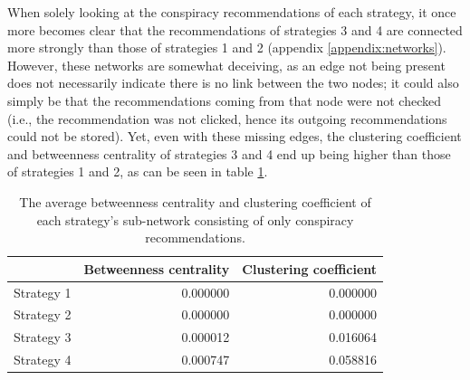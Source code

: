 \documentclass[../main.tex]{subfiles}
\begin{document}
When solely looking at the conspiracy recommendations of each strategy, it once more becomes clear that the 
recommendations of strategies 3 and 4 are connected more strongly than those of strategies 1 and 2 (appendix 
\ref{appendix:networks}). However, these networks are somewhat deceiving, as an edge not being present does not 
necessarily indicate there is no link between the two nodes; it could also simply be that the recommendations 
coming from that node were not checked (i.e., the recommendation was not clicked, hence its outgoing 
recommendations could not be stored). Yet, even with these missing edges, the clustering coefficient and 
betweenness centrality of strategies 3 and 4 end up being higher than those of strategies 1 and 2, as can be 
seen in table \ref{tab:sub-net_metrics}. 

\begin{table}[h]
\centering
\begin{tabular}{lrr}
\toprule
{} &  Betweenness centrality &  Clustering coefficient \\
\midrule
Strategy 1 &                0.000000 &                0.000000 \\
Strategy 2 &                0.000000 &                0.000000 \\
Strategy 3 &                0.000012 &                0.016064 \\
Strategy 4 &                0.000747 &                0.058816 \\
\bottomrule
\end{tabular}
\caption{\label{tab:sub-net_metrics} The average betweenness centrality and clustering coefficient of each strategy's sub-network consisting of only conspiracy recommendations.}
\end{table}
\end{document}
